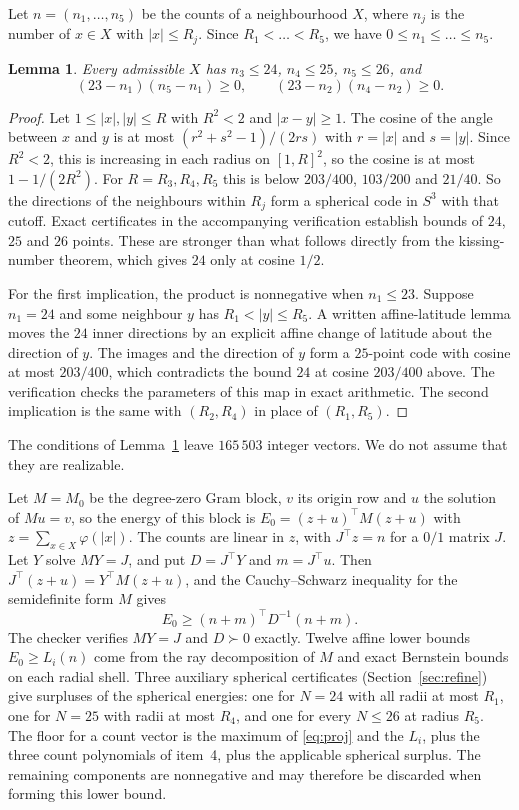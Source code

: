 \documentclass[11pt]{amsart}
\numberwithin{equation}{section}
\newtheorem{lemma}[theorem]{Lemma}
\theoremstyle{remark}
\begin{document}
Let $n=(n_1,\dots,n_5)$ be the counts of a neighbourhood $X$, where $n_j$ is the number of $x\in X$ with $|x|\le R_j$. Since $R_1<\dots<R_5$, we have $0\le n_1\le\dots\le n_5$.

\begin{lemma}\label{lem:counts}
Every admissible $X$ has $n_3\le24$, $n_4\le25$, $n_5\le26$, and
\[
(23-n_1)(n_5-n_1)\ge0,\qquad(23-n_2)(n_4-n_2)\ge0.
\]
\end{lemma}

\begin{proof}
Let $1\le|x|,|y|\le R$ with $R^2<2$ and $|x-y|\ge1$. The cosine of the angle between $x$ and $y$ is at most $(r^2+s^2-1)/(2rs)$ with $r=|x|$ and $s=|y|$. Since $R^2<2$, this is increasing in each radius on $[1,R]^2$, so the cosine is at most $1-1/(2R^2)$. For $R=R_3,R_4,R_5$ this is below $203/400$, $103/200$ and $21/40$. So the directions of the neighbours within $R_j$ form a spherical code in $S^3$ with that cutoff. Exact certificates in the accompanying verification establish bounds of $24$, $25$ and $26$ points. These are stronger than what follows directly from the kissing-number theorem, which gives $24$ only at cosine $1/2$.

For the first implication, the product is nonnegative when $n_1\le23$. Suppose $n_1=24$ and some neighbour $y$ has $R_1<|y|\le R_5$. A written affine-latitude lemma moves the $24$ inner directions by an explicit affine change of latitude about the direction of $y$. The images and the direction of $y$ form a $25$-point code with cosine at most $203/400$, which contradicts the bound $24$ at cosine $203/400$ above. The verification checks the parameters of this map in exact arithmetic. The second implication is the same with $(R_2,R_4)$ in place of $(R_1,R_5)$.
\end{proof}

The conditions of Lemma~\ref{lem:counts} leave $165\,503$ integer vectors. We do not assume that they are realizable.

Let $M=M_0$ be the degree-zero Gram block, $v$ its origin row and $u$ the solution of $Mu=v$, so the energy of this block is $E_0=(z+u)^\top M(z+u)$ with $z=\sum_{x\in X}\varphi(|x|)$. The counts are linear in $z$, with $J^\top z=n$ for a $0/1$ matrix $J$. Let $Y$ solve $MY=J$, and put $D=J^\top Y$ and $m=J^\top u$. Then $J^\top(z+u)=Y^\top M(z+u)$, and the Cauchy--Schwarz inequality for the semidefinite form $M$ gives
\begin{equation}\label{eq:proj}
E_0\ge(n+m)^\top D^{-1}(n+m).
\end{equation}
The checker verifies $MY=J$ and $D\succ0$ exactly. Twelve affine lower bounds $E_0\ge L_i(n)$ come from the ray decomposition of $M$ and exact Bernstein bounds on each radial shell. Three auxiliary spherical certificates (Section~\ref{sec:refine}) give surpluses of the spherical energies: one for $N=24$ with all radii at most $R_1$, one for $N=25$ with radii at most $R_4$, and one for every $N\le26$ at radius $R_5$. The floor for a count vector is the maximum of \eqref{eq:proj} and the $L_i$, plus the three count polynomials of item~4, plus the applicable spherical surplus. The remaining components are nonnegative and may therefore be discarded when forming this lower bound.
\end{document}
